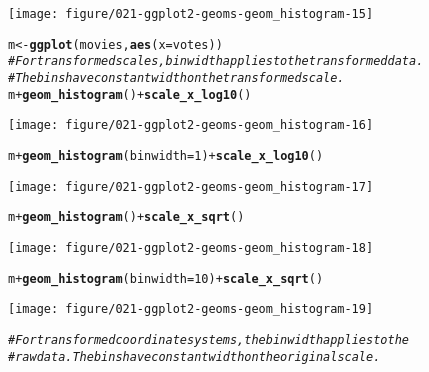 \documentclass[a4paper,titlepage]{tufte-handout}\usepackage[]{graphicx}\usepackage[]{color}
\makeatletter
\def\maxwidth{ %
  \ifdim\Gin@nat@width>\linewidth
    \linewidth
  \else
    \Gin@nat@width
  \fi
}
\newcommand{\hlnum}[1]{\textcolor[rgb]{0.686,0.059,0.569}{#1}}%
\newcommand{\hlcom}[1]{\textcolor[rgb]{0.678,0.584,0.686}{\textit{#1}}}%
\newcommand{\hlopt}[1]{\textcolor[rgb]{0,0,0}{#1}}%
\newcommand{\hlstd}[1]{\textcolor[rgb]{0.345,0.345,0.345}{#1}}%
\newcommand{\hlkwb}[1]{\textcolor[rgb]{0.69,0.353,0.396}{#1}}%
\newcommand{\hlkwc}[1]{\textcolor[rgb]{0.333,0.667,0.333}{#1}}%
\newcommand{\hlkwd}[1]{\textcolor[rgb]{0.737,0.353,0.396}{\textbf{#1}}}%
\newenvironment{kframe}{%
 \def\at@end@of@kframe{}%
 \ifinner\ifhmode%
  \def\at@end@of@kframe{\end{minipage}}%
  \begin{minipage}{\columnwidth}%
 \fi\fi%
 \def\FrameCommand##1{\hskip\@totalleftmargin \hskip-\fboxsep
 \colorbox{shadecolor}{##1}\hskip-\fboxsep
     \hskip-\linewidth \hskip-\@totalleftmargin \hskip\columnwidth}%
 \MakeFramed {\advance\hsize-\width
   \@totalleftmargin\z@ \linewidth\hsize
   \@setminipage}}%
 {\par\unskip\endMakeFramed%
 \at@end@of@kframe}
\newenvironment{knitrout}{}{} %
\makeatother
\begin{document}
\begin{knitrout}
\begin{kframe}
{\ttfamily\noindent\color{warningcolor}{\#\# Warning in loop\_apply(n, do.ply): position\_stack requires constant width: output may be incorrect}}\end{kframe}
\texttt{[image: figure/021-ggplot2-geoms-geom\_histogram-15]} 
\begin{kframe}\begin{alltt}
\hlstd{m} \hlkwb{<-} \hlkwd{ggplot}\hlstd{(movies,} \hlkwd{aes}\hlstd{(}\hlkwc{x} \hlstd{= votes))}
\hlcom{# For transformed scales, binwidth applies to the transformed data.}
\hlcom{# The bins have constant width on the transformed scale.}
\hlstd{m} \hlopt{+} \hlkwd{geom_histogram}\hlstd{()} \hlopt{+} \hlkwd{scale_x_log10}\hlstd{()}
\end{alltt}
\end{kframe}
\texttt{[image: figure/021-ggplot2-geoms-geom\_histogram-16]} 
\begin{kframe}\begin{alltt}
\hlstd{m} \hlopt{+} \hlkwd{geom_histogram}\hlstd{(}\hlkwc{binwidth} \hlstd{=} \hlnum{1}\hlstd{)} \hlopt{+} \hlkwd{scale_x_log10}\hlstd{()}
\end{alltt}
\end{kframe}
\texttt{[image: figure/021-ggplot2-geoms-geom\_histogram-17]} 
\begin{kframe}\begin{alltt}
\hlstd{m} \hlopt{+} \hlkwd{geom_histogram}\hlstd{()} \hlopt{+} \hlkwd{scale_x_sqrt}\hlstd{()}
\end{alltt}
\end{kframe}
\texttt{[image: figure/021-ggplot2-geoms-geom\_histogram-18]} 
\begin{kframe}\begin{alltt}
\hlstd{m} \hlopt{+} \hlkwd{geom_histogram}\hlstd{(}\hlkwc{binwidth} \hlstd{=} \hlnum{10}\hlstd{)} \hlopt{+} \hlkwd{scale_x_sqrt}\hlstd{()}
\end{alltt}
\end{kframe}
\texttt{[image: figure/021-ggplot2-geoms-geom\_histogram-19]} 
\begin{kframe}\begin{alltt}
\hlcom{# For transformed coordinate systems, the binwidth applies to the}
\hlcom{# raw data.  The bins have constant width on the original scale.}


\end{alltt}
\end{kframe}
\end{knitrout}
\end{document}
